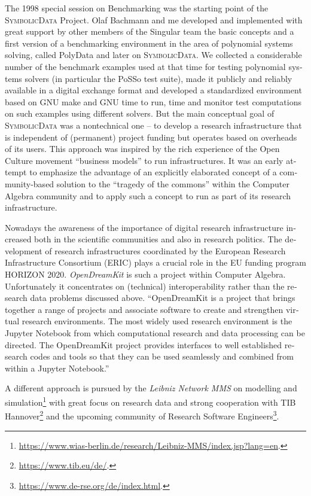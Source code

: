 \documentclass[11pt]{article}
\def\SD{\textsc{SymbolicData}}
\begin{document}
\begin{otherlanguage}{english}
\begin{multicols}{2}
The 1998 special session on Benchmarking was the starting point of the {\SD}
Project. Olaf Bachmann and me developed and implemented with great support by
other members of the Singular team the basic concepts and a first version of a
benchmarking environment in the area of polynomial systems solving, called {\sc
  PolyData} and later on {\SD}.  We collected a considerable number of the
benchmark examples used at that time for testing polynomial systems solvers (in
particular the PoSSo test suite), made it publicly and reliably available in a
digital exchange format and developed a standardized environment based on GNU
make and GNU time to run, time and monitor test computations on such examples
using different solvers. But the main conceptual goal of {\SD} was a
nontechnical one – to develop a research infrastructure that is independent of
(permanent) project funding but operates based on overheads of its users. This
approach was inspired by the rich experience of the Open Culture movement
“business models” to run infrastructures. It was an early attempt to emphasize
the advantage of an explicitly elaborated concept of a community-based solution
to the “tragedy of the commons” within the Computer Algebra community and to
apply such a concept to run as part of its research infrastructure.

Nowadays the awareness of the importance of digital research infrastructure
increased both in the scientific communities and also in research politics.
The development of research infrastructures coordinated by the European
Research Infrastructure Consortium (ERIC) plays a crucial role in the EU
funding program HORIZON 2020. \emph{OpenDreamKit} is such a project within
Computer Algebra.  Unfortunately it concentrates on (technical)
interoperability rather than the research data problems discussed above.
``OpenDreamKit is a project that brings together a range of projects and
associate software to create and strengthen virtual research environments. The
most widely used research environment is the Jupyter Notebook from which
computational research and data processing can be directed. The OpenDreamKit
project provides interfaces to well established research codes and tools so
that they can be used seamlessly and combined from within a Jupyter Notebook.''

A different approach is pursued by the \emph{Leibniz Network MMS} on modelling
and
simulation\footnote{\url{https://www.wias-berlin.de/research/Leibniz-MMS/index.jsp?lang=en}.}
with great focus on research data and strong cooperation with TIB
Hannover\footnote{\url{https://www.tib.eu/de/}.} and the upcoming community of 
Research Software
Engineers\footnote{\url{https://www.de-rse.org/de/index.html}.}. 


\end{multicols}
\end{otherlanguage}
\end{document}
